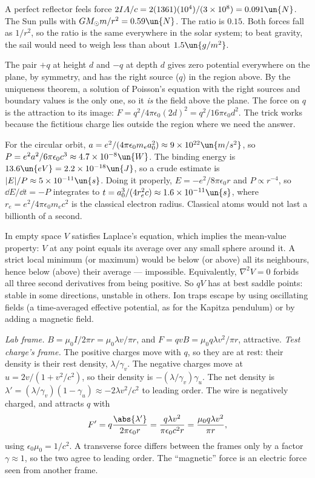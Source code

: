  A perfect reflector feels force $2IA/c = 2(1361)(10^4)/(3\times10^8) = 0.091\un{N}$. The Sun pulls with $GM_\odot m/r^2 = 0.59\un{N}$. The ratio is $0.15$. Both forces fall as $1/r^2$, so the ratio is the same everywhere in the solar system; to beat gravity, the sail would need to weigh less than about $1.5\un{g/m^2}$.

 The pair $+q$ at height $d$ and $-q$ at depth $d$ gives zero potential everywhere on the plane, by symmetry, and has the right source ($q$) in the region above. By the uniqueness theorem, a solution of Poisson's equation with the right sources and boundary values is the only one, so it \emph{is} the field above the plane. The force on $q$ is the attraction to its image: $F = q^2/4\pi\epsilon_0(2d)^2 = q^2/16\pi\epsilon_0d^2$. The trick works because the fictitious charge lies outside the region where we need the answer.

 For the circular orbit, $a = e^2/(4\pi\epsilon_0m_ea_0^2)\approx9\times10^{22}\un{m/s^2}$, so $P = e^2a^2/6\pi\epsilon_0c^3\approx4.7\times10^{-8}\un{W}$. The binding energy is $13.6\un{eV} = 2.2\times10^{-18}\un{J}$, so a crude estimate is $|E|/P\approx5\times10^{-11}\un{s}$. Doing it properly, $E = -e^2/8\pi\epsilon_0r$ and $P\propto r^{-4}$, so $\dd E/\dd t = -P$ integrates to $t = a_0^3/(4r_e^2c)\approx1.6\times10^{-11}\un{s}$, where $r_e = e^2/4\pi\epsilon_0m_ec^2$ is the classical electron radius. Classical atoms would not last a billionth of a second.

 In empty space $V$ satisfies Laplace's equation, which implies the mean-value property: $V$ at any point equals its average over any small sphere around it. A strict local minimum (or maximum) would be below (or above) all its neighbours, hence below (above) their average --- impossible. Equivalently, $\nabla^2V = 0$ forbids all three second derivatives from being positive. So $qV$ has at best saddle points: stable in some directions, unstable in others. Ion traps escape by using oscillating fields (a time-averaged effective potential, as for the Kapitza pendulum) or by adding a magnetic field.

 \emph{Lab frame.} $B = \mu_0I/2\pi r = \mu_0\lambda v/\pi r$, and $F = qvB = \mu_0q\lambda v^2/\pi r$, attractive.
\emph{Test charge's frame.} The positive charges move with $q$, so they are at rest: their density is their rest density, $\lambda/\gamma_v$. The negative charges move at $u = 2v/(1+v^2/c^2)$, so their density is $-(\lambda/\gamma_v)\gamma_u$. The net density is $\lambda' = (\lambda/\gamma_v)(1-\gamma_u)\approx-2\lambda v^2/c^2$ to leading order. The wire is negatively charged, and attracts $q$ with
\[
  F' = q\frac{\abs{\lambda'}}{2\pi\epsilon_0r} = \frac{q\lambda v^2}{\pi\epsilon_0c^2r} = \frac{\mu_0q\lambda v^2}{\pi r},
\]
using $\epsilon_0\mu_0 = 1/c^2$. A transverse force differs between the frames only by a factor $\gamma\approx1$, so the two agree to leading order. The ``magnetic'' force is an electric force seen from another frame.
